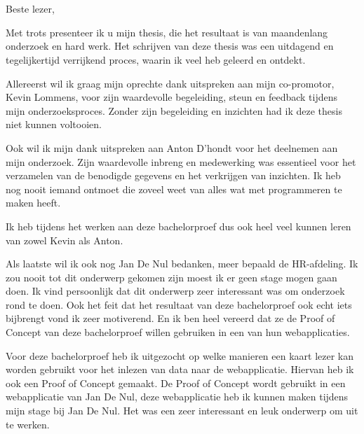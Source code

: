 
\chapter*{}%
\label{ch:voorwoord}

Beste lezer,

Met trots presenteer ik u mijn thesis, die het resultaat is van maandenlang onderzoek en hard werk. Het schrijven van deze thesis was een uitdagend en tegelijkertijd verrijkend proces, waarin ik veel heb geleerd en ontdekt.

Allereerst wil ik graag mijn oprechte dank uitspreken aan mijn co-promotor, Kevin Lommens, voor zijn waardevolle begeleiding, steun en feedback tijdens mijn onderzoeksproces. Zonder zijn begeleiding en inzichten had ik deze thesis niet kunnen voltooien.

Ook wil ik mijn dank uitspreken aan Anton D'hondt voor het deelnemen aan mijn onderzoek. Zijn waardevolle inbreng en medewerking was essentieel voor het verzamelen van de benodigde gegevens en het verkrijgen van inzichten. Ik heb nog nooit iemand ontmoet die zoveel weet van alles wat met programmeren te maken heeft.

Ik heb tijdens het werken aan deze bachelorproef dus ook heel veel kunnen leren van zowel Kevin als Anton. 

Als laatste wil ik ook nog Jan De Nul bedanken, meer bepaald de HR-afdeling. Ik zou nooit tot dit onderwerp gekomen zijn moest ik er geen stage mogen gaan doen. Ik vind persoonlijk dat dit onderwerp zeer interessant was om onderzoek rond te doen. Ook het feit dat het resultaat van deze bachelorproef ook echt iets bijbrengt vond ik zeer motiverend. En ik ben heel vereerd dat ze de Proof of Concept van deze bachelorproef willen gebruiken in een van hun webapplicaties.

Voor deze bachelorproef heb ik uitgezocht op welke manieren een kaart lezer kan worden gebruikt voor het inlezen van data naar de webapplicatie. Hiervan heb ik ook een Proof of Concept gemaakt. De Proof of Concept wordt gebruikt in een webapplicatie van Jan De Nul, deze webapplicatie heb ik kunnen maken tijdens mijn stage bij Jan De Nul. Het was een zeer interessant en leuk onderwerp om uit te werken.